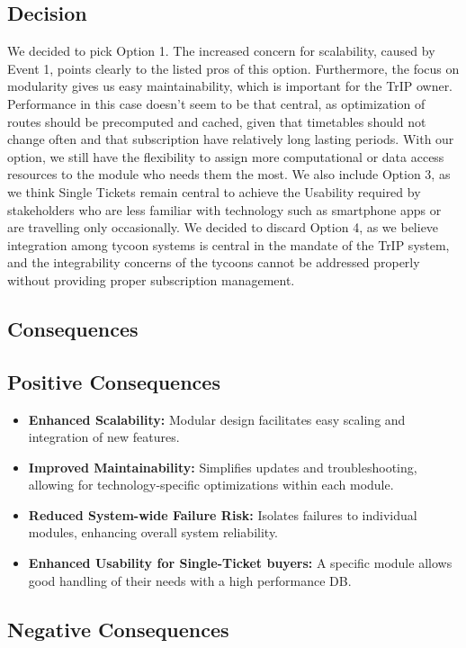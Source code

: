 \subsection*{Decision}
We decided to pick Option 1. The increased concern for scalability, caused by Event 1, points clearly to the listed pros of this option. Furthermore, the focus on modularity
gives us easy maintainability, which is important for the TrIP owner.
Performance in this case doesn't seem to be that central, as optimization of routes should be precomputed and cached, given that timetables should not change often and that subscription have relatively long lasting periods.
With our option, we still have the flexibility to assign more computational or data access resources to the module who needs them the most.
We also include Option 3, as we think Single Tickets remain central to achieve the Usability required by stakeholders who are less familiar with technology such as smartphone apps or are travelling only occasionally.
We decided to discard Option 4, as we believe integration among tycoon systems is central in the mandate of the TrIP system, and the integrability concerns of the tycoons cannot be addressed properly without providing proper subscription management.

\subsection*{Consequences}
\subsection*{Positive Consequences}

\begin{itemize}[noitemsep]
    \item \textbf{Enhanced Scalability:} Modular design facilitates easy scaling and integration of new features.
    \item \textbf{Improved Maintainability:} Simplifies updates and troubleshooting, allowing for technology-specific optimizations within each module.
    \item \textbf{Reduced System-wide Failure Risk:} Isolates failures to individual modules, enhancing overall system reliability.
    \item \textbf{Enhanced Usability for Single-Ticket buyers:} A specific module allows good handling of their needs with a high performance DB.
\end{itemize}

\subsection*{Negative Consequences}


